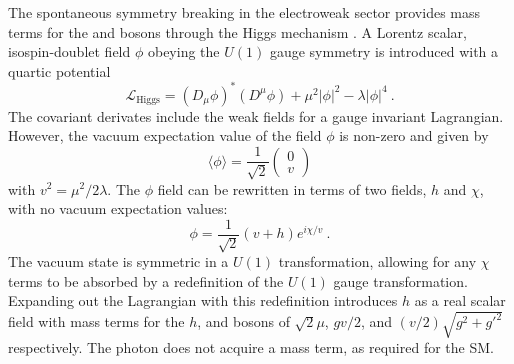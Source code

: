 The spontaneous symmetry breaking in the electroweak sector provides mass terms for the \PW and \PZ bosons through the Higgs mechanism \cite{PhysRevLett.13.321,PhysRevLett.13.508,PhysRevLett.13.585}. A Lorentz scalar, isospin-doublet field $\phi$ obeying the $U(1)$ gauge symmetry is introduced with a quartic potential
%
\begin{equation}
    \mathcal{L}_{\mathrm{Higgs}} = (D_\mu\phi)^*(D^\mu\phi) +\mu^2|\phi|^2 - \lambda|\phi|^4\ .
\end{equation}
%
The covariant derivates include the weak fields for a gauge invariant Lagrangian. However, the vacuum expectation value of the field $\phi$ is non-zero and given by
%
\begin{equation}
    \langle \phi \rangle = \frac{1}{\sqrt{2}}
    \begin{pmatrix}
        0 \\ v
    \end{pmatrix}
\end{equation}
%
with $v^2=\mu^2/2\lambda$. The $\phi$ field can be rewritten in terms of two fields, $h$ and $\chi$, with no vacuum expectation values:
%
\begin{equation}\label{eq:phi}
    \phi = \frac{1}{\sqrt{2}}(v + h)e^{i\chi/v}\ .
\end{equation}
%
The vacuum state is symmetric in a $U(1)$ transformation, allowing for any $\chi$ terms to be absorbed by a redefinition of the $U(1)$ gauge transformation. Expanding out the Lagrangian with this redefinition introduces $h$ as a real scalar field with mass terms for the $h$, \PW and \PZ bosons of $\sqrt{2}\mu$, $gv/2$, and $(v/2)\sqrt{g^2+g'^2}$ respectively. The photon does not acquire a mass term, as required for the SM.

